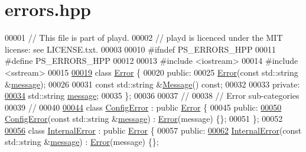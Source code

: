 \hypertarget{errors_8hpp_source}{\section{errors.\+hpp}
\label{errors_8hpp_source}
}

\begin{DoxyCode}
00001 \textcolor{comment}{// This file is part of playd.}
00002 \textcolor{comment}{// playd is licenced under the MIT license: see LICENSE.txt.}
00003 
00010 \textcolor{preprocessor}{#ifndef PS\_ERRORS\_HPP}
00011 \textcolor{preprocessor}{#define PS\_ERRORS\_HPP}
00012 
00013 \textcolor{preprocessor}{#include <iostream>}
00014 \textcolor{preprocessor}{#include <sstream>}
00015 
\hypertarget{errors_8hpp_source_l00019}{}\hyperlink{classError}{00019} \textcolor{keyword}{class }\hyperlink{classError}{Error} \{
00020 \textcolor{keyword}{public}:
00025     \hyperlink{classError_accd611f3ddae0828adeb6ca251113ffd}{Error}(\textcolor{keyword}{const} std::string &\hyperlink{classError_aa4713ef3ee9c3c0da43a54b01949510d}{message});
00026 
00031     \textcolor{keyword}{const} std::string &\hyperlink{classError_a006605b13a346cf019f60420f1b29b5a}{Message}() \textcolor{keyword}{const};
00032 
00033 \textcolor{keyword}{private}:
\hypertarget{errors_8hpp_source_l00034}{}\hyperlink{classError_aa4713ef3ee9c3c0da43a54b01949510d}{00034}     std::string \hyperlink{classError_aa4713ef3ee9c3c0da43a54b01949510d}{message}; 
00035 \};
00036 
00037 \textcolor{comment}{//}
00038 \textcolor{comment}{// Error sub-categories}
00039 \textcolor{comment}{//}
00040 
\hypertarget{errors_8hpp_source_l00044}{}\hyperlink{classConfigError}{00044} \textcolor{keyword}{class }\hyperlink{classConfigError}{ConfigError} : \textcolor{keyword}{public} \hyperlink{classError}{Error} \{
00045 \textcolor{keyword}{public}:
\hypertarget{errors_8hpp_source_l00050}{}\hyperlink{classConfigError_a0df38d0770d8e8299e628793058bb2eb}{00050}     \hyperlink{classConfigError_a0df38d0770d8e8299e628793058bb2eb}{ConfigError}(\textcolor{keyword}{const} std::string &\hyperlink{classError_aa4713ef3ee9c3c0da43a54b01949510d}{message}) : \hyperlink{classError}{Error}(message) \{\};
00051 \};
00052 
\hypertarget{errors_8hpp_source_l00056}{}\hyperlink{classInternalError}{00056} \textcolor{keyword}{class }\hyperlink{classInternalError}{InternalError} : \textcolor{keyword}{public} \hyperlink{classError}{Error} \{
00057 \textcolor{keyword}{public}:
\hypertarget{errors_8hpp_source_l00062}{}\hyperlink{classInternalError_a02889f0d60c52bb6b92c522c034aa0bf}{00062}     \hyperlink{classInternalError_a02889f0d60c52bb6b92c522c034aa0bf}{InternalError}(\textcolor{keyword}{const} std::string &\hyperlink{classError_aa4713ef3ee9c3c0da43a54b01949510d}{message}) : \hyperlink{classError}{Error}(message) \{\};

\end{DoxyCode}
